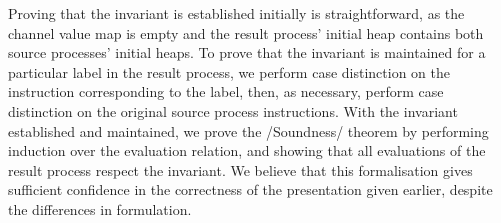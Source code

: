 Proving that the invariant is established initially is straightforward, as the channel value map is empty and the result process' initial heap contains both source processes' initial heaps.
To prove that the invariant is maintained for a particular label in the result process, we perform case distinction on the instruction corresponding to the label, then, as necessary, perform case distinction on the original source process instructions.
With the invariant established and maintained, we prove the \Hs/Soundness/ theorem by performing induction over the evaluation relation, and showing that all evaluations of the result process respect the invariant.
We believe that this formalisation gives sufficient confidence in the correctness of the presentation given earlier, despite the differences in formulation.

% 

